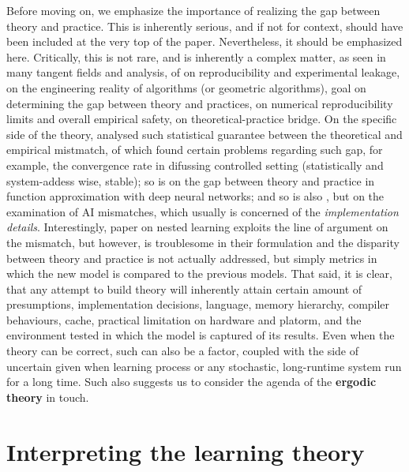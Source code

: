 Before moving on, we emphasize the importance of realizing the gap between theory and practice. This is inherently serious, and if not for context, should have been included at the very top of the paper. Nevertheless, it should be emphasized here. Critically, this is not rare, and is inherently a complex matter, as seen in many tangent fields and analysis, of \cite{semmelrock2023reproducibilitymachinelearningdrivenresearch,KAPOOR2023100804} on reproducibility and experimental leakage, \cite{Kliemann2016,Tamassia1997ACS} on the engineering reality of algorithms (or geometric algorithms), \cite{bgpt2024} goal on determining the gap between theory and practices, \cite{Revol_2014,COLLANGE201583,Diethelm2012} on numerical reproducibility limits and overall empirical safety, \cite{Kaskenpalo_2012} on theoretical-practice bridge. On the specific side of the theory, \cite{holk2025statisticalguaranteesdenoisingreflected} analysed such statistical guarantee between the theoretical and empirical mistmatch, of which found certain problems regarding such gap, for example, the convergence rate in difussing controlled setting (statistically and system-addess wise, stable); so is \cite{adcock2021gaptheorypracticefunction} on the gap between theory and practice in function approximation with deep neural networks; and so is also \cite{saxena2025aimismatchesidentifyingpotential}, but on the examination of AI mismatches, which usually is concerned of the \textit{implementation details}. Interestingly, \cite{behrouz2025nested} paper on nested learning exploits the line of argument on the mismatch, but however, is troublesome in their formulation and the disparity between theory and practice is not actually addressed, but simply metrics in which the new model is compared to the previous models. That said, it is clear, that any attempt to build theory will inherently attain certain amount of presumptions, implementation decisions, language, memory hierarchy, compiler behaviours, cache, practical limitation on hardware and platorm, and the environment tested in which the model is captured of its results. Even when the theory can be correct, such can also be a factor, coupled with the side of uncertain given when learning process or any stochastic, long-runtime system run for a long time. Such also suggests us to consider the agenda of the \textbf{ergodic theory} in touch. 

\section{Interpreting the learning theory}

